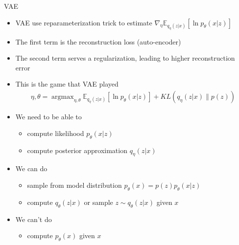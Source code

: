 \documentclass[compress]{beamer}
\newcommand{\expects}[2]{\mathbb{E}_{#1} \left[ #2 \right]}
\begin{document}
\begin{frame}[allowframebreaks]{VAE}
\begin{itemize}
        \item VAE use reparameterization trick to estimate $\nabla_\eta \expects{q_{\eta}(z|x)}{\ln p_{\theta}(x|z)}$
        \item The first term is the reconstruction loss (auto-encoder)
        \item The second term serves a regularization, leading to higher reconstruction error
    \end{itemize}
    \framebreak
    \begin{itemize}
        \item This is the game that VAE played
            \begin{align*}
                \eta, \theta = \mathop{argmax}_{\eta, \theta} \expects{q_{\eta}(z|x)}{\ln p_{\theta}(x|z)} + KL(q_{\eta}(z|x)\|p(z))
            \end{align*}
        \item We need to be able to
            \begin{itemize}
                \item compute likelihood $p_\theta(x|z)$
                \item compute posterior approximation $q_{\eta}(z|x)$
            \end{itemize}
        \item We can do
            \begin{itemize}
                \item sample from model distribution $p_\theta(x)=p(z)p_\theta(x|z)$
                \item compute $q_{\theta}(z|x)$ or sample $z\sim q_{\theta}(z|x)$ given $x$
            \end{itemize}
        \item We can't do
            \begin{itemize}
                \item compute $p_{\theta}(x)$ given $x$
            \end{itemize}
    \end{itemize}
\end{frame}
\end{document}

